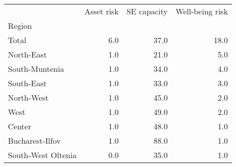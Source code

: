 \begin{tabular}{lrrr}
\toprule
{} &  Asset risk &  SE capacity &  Well-being risk \\
Region             &             &              &                  \\
\midrule
Total              &         6.0 &         37.0 &             18.0 \\
North-East         &         1.0 &         21.0 &              5.0 \\
South-Muntenia     &         1.0 &         34.0 &              4.0 \\
South-East         &         1.0 &         33.0 &              3.0 \\
North-West         &         1.0 &         45.0 &              2.0 \\
West               &         1.0 &         49.0 &              2.0 \\
Center             &         1.0 &         48.0 &              1.0 \\
Bucharest-Ilfov    &         1.0 &         88.0 &              1.0 \\
South-West Oltenia &         0.0 &         35.0 &              1.0 \\
\bottomrule
\end{tabular}
